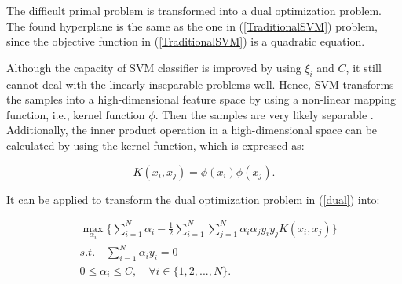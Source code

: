 The difficult primal problem is transformed into a dual optimization problem. The found hyperplane is the same as the one in (\ref{TraditionalSVM}) problem, since the objective function in (\ref{TraditionalSVM}) is a quadratic equation.

Although the capacity of SVM classifier is improved by using $\xi_i$ and $ C $, it still cannot deal with the linearly inseparable problems well. Hence, SVM transforms the samples into a high-dimensional feature space by using a non-linear mapping function, i.e., kernel function $\phi$. Then the samples are very likely separable \cite{liu2022data}. Additionally, the inner product operation in a high-dimensional space can be calculated by using the kernel function, which is expressed as:

\begin{equation}
	K(x_i,x_j)=\phi(x_i)\phi(x_j).
\end{equation}

It can be applied to transform the dual optimization problem in (\ref{dual}) into:

\begin{equation}\label{kernalsvm}
	\begin{split}
		& \mathop{\max}\limits_{\alpha_i}\{\sum\limits_{i=1}^N\alpha_i
		-\frac{1}{2}\sum\limits_{i=1}^N\sum\limits_{j=1}^N\alpha_i\alpha_jy_iy_jK(x_i,x_j)\}\\
		& s.t. \quad \sum\limits_{i=1}^N\alpha_iy_i = 0\\
		&0\le\alpha_i\le C,\quad\forall i\in \{1,2,...,N\}.\\
	\end{split}
\end{equation}